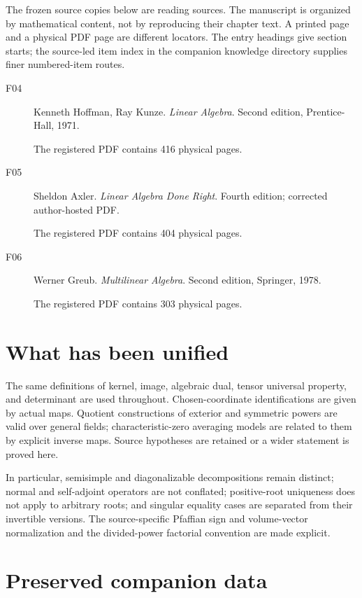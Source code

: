 \documentclass[11pt,a4paper]{book}
\theoremstyle{definition}\newtheorem{definition}[theorem]{Definition}
\theoremstyle{remark}\newtheorem{remark}[theorem]{Remark}
\begin{document}
The frozen source copies below are reading sources. The manuscript is organized by mathematical content, not by reproducing their chapter text. A printed page and a physical PDF page are different locators. The entry headings give section starts; the source-led item index in the companion knowledge directory supplies finer numbered-item routes.

\begin{description}

\item[F04] Kenneth Hoffman, Ray Kunze. \emph{Linear Algebra}. Second edition, Prentice-Hall, 1971.

The registered PDF contains 416 physical pages.

\item[F05] Sheldon Axler. \emph{Linear Algebra Done Right}. Fourth edition; corrected author-hosted PDF.

The registered PDF contains 404 physical pages.

\item[F06] Werner Greub. \emph{Multilinear Algebra}. Second edition, Springer, 1978.

The registered PDF contains 303 physical pages.

\end{description}

\section*{What has been unified}

The same definitions of kernel, image, algebraic dual, tensor universal property, and determinant are used throughout. Chosen-coordinate identifications are given by actual maps. Quotient constructions of exterior and symmetric powers are valid over general fields; characteristic-zero averaging models are related to them by explicit inverse maps. Source hypotheses are retained or a wider statement is proved here.

In particular, semisimple and diagonalizable decompositions remain distinct; normal and self-adjoint operators are not conflated; positive-root uniqueness does not apply to arbitrary roots; and singular equality cases are separated from their invertible versions. The source-specific Pfaffian sign and volume-vector normalization and the divided-power factorial convention are made explicit.

\section*{Preserved companion data}
\end{document}
